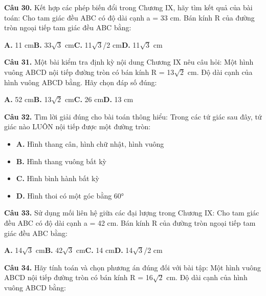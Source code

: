 \documentclass[11pt,a4paper]{article}
\begin{document}
\textbf{\color{primary} Câu 30.} Kết hợp các phép biến đổi trong Chương IX, hãy tìm kết quả của bài toán: Cho tam giác đều ABC có độ dài cạnh a = 33 cm. Bán kính R của đường tròn ngoại tiếp tam giác đều ABC bằng:\par
\hspace*{1.5em}\textbf{A.} 11 cm\quad\quad \textbf{B.} 33$\sqrt{3}$ cm\quad\quad \textbf{C.} 11$\sqrt{3}$/2 cm\quad\quad \textbf{D.} 11$\sqrt{3}$ cm\par\vspace{2pt}
\textbf{\color{primary} Câu 31.} Một bài kiểm tra định kỳ nội dung Chương IX nêu câu hỏi: Một hình vuông ABCD nội tiếp đường tròn có bán kính R = 13$\sqrt{2}$ cm. Độ dài cạnh của hình vuông ABCD bằng. Hãy chọn đáp số đúng:\par
\hspace*{1.5em}\textbf{A.} 52 cm\quad\quad \textbf{B.} 13$\sqrt{2}$ cm\quad\quad \textbf{C.} 26 cm\quad\quad \textbf{D.} 13 cm\par\vspace{2pt}
\textbf{\color{primary} Câu 32.} Tìm lời giải đúng cho bài toán thông hiểu: Trong các tứ giác sau đây, tứ giác nào LUÔN nội tiếp được một đường tròn:\par
\begin{itemize}\setlength{\itemsep}{1pt}\setlength{\parskip}{0pt}
  \item[] \textbf{A.} Hình thang cân, hình chữ nhật, hình vuông
  \item[] \textbf{B.} Hình thang vuông bất kỳ
  \item[] \textbf{C.} Hình bình hành bất kỳ
  \item[] \textbf{D.} Hình thoi có một góc bằng 60°
\end{itemize}\vspace{2pt}
\textbf{\color{primary} Câu 33.} Sử dụng mối liên hệ giữa các đại lượng trong Chương IX: Cho tam giác đều ABC có độ dài cạnh a = 42 cm. Bán kính R của đường tròn ngoại tiếp tam giác đều ABC bằng:\par
\hspace*{1.5em}\textbf{A.} 14$\sqrt{3}$ cm\quad\quad \textbf{B.} 42$\sqrt{3}$ cm\quad\quad \textbf{C.} 14 cm\quad\quad \textbf{D.} 14$\sqrt{3}$/2 cm\par\vspace{2pt}
\textbf{\color{primary} Câu 34.} Hãy tính toán và chọn phương án đúng đối với bài tập: Một hình vuông ABCD nội tiếp đường tròn có bán kính R = 16$\sqrt{2}$ cm. Độ dài cạnh của hình vuông ABCD bằng:\par
\end{document}

